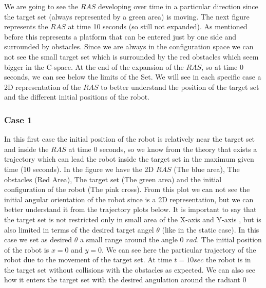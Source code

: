 We are going to see the $RAS$ developing over time in a particular direction since the target set (always represented by a green area) is moving. The next figure represents the $RAS$ at time 10 seconds (so still not expanded). As mentioned before this represents a platform that can be entered just by one side and surrounded by obstacles. Since we are always in the configuration space we can not see the small target set which is surrounded by the red obstacles which seem bigger in the C-space.
At the end of the expansion of the $RAS$, so at time 0 seconds, we can see below the limits of the Set.
We will see in each specific case a 2D representation of the $RAS$ to better understand the position of the target set and the different initial positions of the robot.
\subsubsection{Case 1}
In this first case the initial position of the robot is relatively near the target set and inside the $RAS$ at time 0 seconds, so we know from the theory that exists a trajectory which can lead the robot inside the target set in the maximum given time (10 seconds).
In the figure we have the 2D $RAS$ (The blue area), The obstacles (Red Area), The target set (The green area) and the initial configuration of the robot (The pink cross). From this plot we can not see the initial angular orientation of the robot since is a 2D representation, but we can better understand it from the trajectory plots below. It is important to say that the target set is not restricted only in small area of the X-axis and Y-axis , but is also limited in terms of the desired target angel $\theta$ (like in the static case). In this case we set as desired $\theta$ a small range around the angle 0 $rad$. The initial position of the robot is $x=0$ and $y=0$.
We can see here the particular trajectory of the robot due to the movement of the target set. At time $t=10sec$ the robot is in the target set without collisions with the obstacles as expected. We can also see how it enters the target set with the desired angulation around the radiant 0

